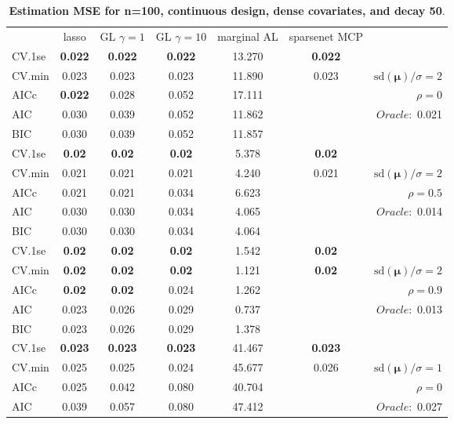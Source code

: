 \clearpage
\begin{table}\vspace{-.5cm}
\caption[l]{ { \bf Estimation MSE for n=100, continuous design, 
dense covariates, and  decay  50}.}
\vspace{-.5cm}
\footnotesize{}
\begin{center}
\begin{tabular}{l*{5}{c}|r}
& lasso & GL $\gamma=1$ & GL $\gamma=10$ & marginal AL & sparsenet MCP  & \\
 \cline{1-7}
CV.1se & {\bf 0.022} & {\bf 0.022} & {\bf 0.022} & 13.270 & {\bf 0.022} & \\
CV.min & 0.023 & 0.023 & 0.023 & 11.890 & 0.023 &  $\mathrm{sd}(\mathbf{\mu})/\sigma=2$ \\
AICc & {\bf 0.022} & 0.028 & 0.052 & 17.111 & & $\rho=0$ \\
AIC & 0.030 & 0.039 & 0.052 & 11.862 & &  \multirow{2}{*}{$Oracle: $ 0.021} \\
BIC & 0.030 & 0.039 & 0.052 & 11.857 & &  \\
 \hline 
CV.1se & {\bf 0.02} & {\bf 0.02} & {\bf 0.02} & 5.378 & {\bf 0.02} & \\
CV.min & 0.021 & 0.021 & 0.021 & 4.240 & 0.021 &  $\mathrm{sd}(\mathbf{\mu})/\sigma=2$ \\
AICc & 0.021 & 0.021 & 0.034 & 6.623 & & $\rho=0.5$ \\
AIC & 0.030 & 0.030 & 0.034 & 4.065 & &  \multirow{2}{*}{$Oracle: $ 0.014} \\
BIC & 0.030 & 0.030 & 0.034 & 4.064 & &  \\
 \hline 
CV.1se & {\bf 0.02} & {\bf 0.02} & {\bf 0.02} & 1.542 & {\bf 0.02} & \\
CV.min & {\bf 0.02} & {\bf 0.02} & {\bf 0.02} & 1.121 & {\bf 0.02} &  $\mathrm{sd}(\mathbf{\mu})/\sigma=2$ \\
AICc & {\bf 0.02} & {\bf 0.02} & 0.024 & 1.262 & & $\rho=0.9$ \\
AIC & 0.023 & 0.026 & 0.029 & 0.737 & &  \multirow{2}{*}{$Oracle: $ 0.013} \\
BIC & 0.023 & 0.026 & 0.029 & 1.378 & &  \\
 \hline 
CV.1se & {\bf 0.023} & {\bf 0.023} & {\bf 0.023} & 41.467 & {\bf 0.023} & \\
CV.min & 0.025 & 0.025 & 0.024 & 45.677 & 0.026 &  $\mathrm{sd}(\mathbf{\mu})/\sigma=1$ \\
AICc & 0.025 & 0.042 & 0.080 & 40.704 & & $\rho=0$ \\
AIC & 0.039 & 0.057 & 0.080 & 47.412 & &  \multirow{2}{*}{$Oracle: $ 0.027} \\

\end{tabular}
\end{center}
\end{table}
